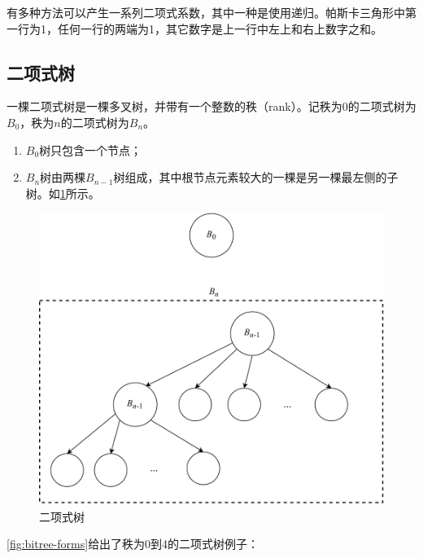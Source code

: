 \documentclass[b5paper]{ctexart}
\begin{document}
有多种方法可以产生一系列二项式系数，其中一种是使用递归。帕斯卡三角形中第一行为1，任何一行的两端为1，其它数字是上一行中左上和右上数字之和。

\subsection{二项式树}
\label{Binomial tree} 

一棵二项式树是一棵多叉树，并带有一个整数的秩（rank）。记秩为0的二项式树为$B_0$，秩为$n$的二项式树为$B_n$。

\begin{enumerate}
\item $B_0$树只包含一个节点；
\item $B_n$树由两棵$B_{n-1}$树组成，其中根节点元素较大的一棵是另一棵最左侧的子树。如\cref{fig:link-bitree}所示。
\end{enumerate}

\begin{figure}[htbp]
  \centering
  \includegraphics[scale=0.5]{img/binomial-tree}
  \caption{二项式树}
  \label{fig:link-bitree}
\end{figure}

\cref{fig:bitree-forms}给出了秩为0到4的二项式树例子：
\end{document}
